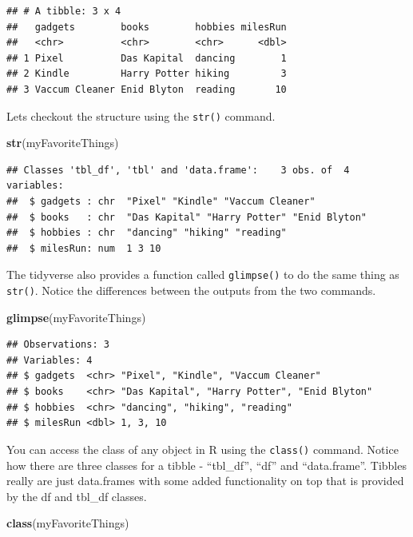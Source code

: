 \documentclass[]{article}
\newenvironment{Shaded}{\begin{snugshade}}{\end{snugshade}}
\newcommand{\KeywordTok}[1]{\textcolor[rgb]{0.13,0.29,0.53}{\textbf{#1}}}
\newcommand{\NormalTok}[1]{#1}
\begin{document}
\begin{verbatim}
## # A tibble: 3 x 4
##   gadgets        books        hobbies milesRun
##   <chr>          <chr>        <chr>      <dbl>
## 1 Pixel          Das Kapital  dancing        1
## 2 Kindle         Harry Potter hiking         3
## 3 Vaccum Cleaner Enid Blyton  reading       10
\end{verbatim}

Lets checkout the structure using the \texttt{str()} command.

\begin{Shaded}
\begin{Highlighting}[]
\KeywordTok{str}\NormalTok{(myFavoriteThings)}
\end{Highlighting}
\end{Shaded}

\begin{verbatim}
## Classes 'tbl_df', 'tbl' and 'data.frame':    3 obs. of  4 variables:
##  $ gadgets : chr  "Pixel" "Kindle" "Vaccum Cleaner"
##  $ books   : chr  "Das Kapital" "Harry Potter" "Enid Blyton"
##  $ hobbies : chr  "dancing" "hiking" "reading"
##  $ milesRun: num  1 3 10
\end{verbatim}

The tidyverse also provides a function called \texttt{glimpse()} to do
the same thing as \texttt{str()}. Notice the differences between the
outputs from the two commands.

\begin{Shaded}
\begin{Highlighting}[]
\KeywordTok{glimpse}\NormalTok{(myFavoriteThings)}
\end{Highlighting}
\end{Shaded}

\begin{verbatim}
## Observations: 3
## Variables: 4
## $ gadgets  <chr> "Pixel", "Kindle", "Vaccum Cleaner"
## $ books    <chr> "Das Kapital", "Harry Potter", "Enid Blyton"
## $ hobbies  <chr> "dancing", "hiking", "reading"
## $ milesRun <dbl> 1, 3, 10
\end{verbatim}

You can access the class of any object in R using the \texttt{class()}
command. Notice how there are three classes for a tibble - ``tbl\_df'',
``df'' and ``data.frame''. Tibbles really are just data.frames with some
added functionality on top that is provided by the df and tbl\_df
classes.

\begin{Shaded}
\begin{Highlighting}[]
\KeywordTok{class}\NormalTok{(myFavoriteThings)}
\end{Highlighting}
\end{Shaded}
\end{document}
